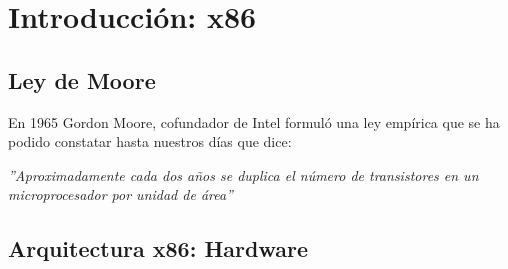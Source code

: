 \documentclass[../main.tex]{subfiles}
\begin{document}

\section{Introducción: x86}
    \subsection*{Ley de Moore}
        En 1965 Gordon Moore, cofundador de Intel formuló una ley empírica que se ha podido constatar hasta nuestros días que dice:

        \textit{”Aproximadamente cada dos años se duplica el número de transistores en un microprocesador por unidad de área”}
    
    \subsection*{Arquitectura x86: Hardware}
\end{document}
